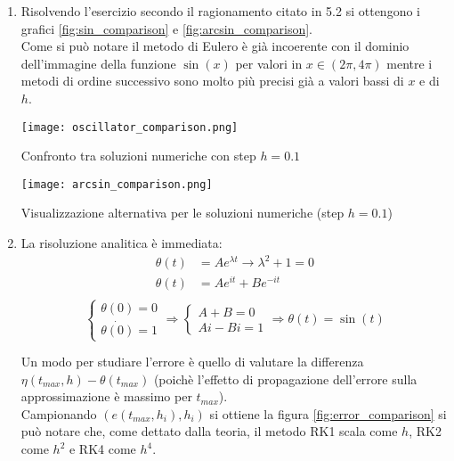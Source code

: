 \begin{enumerate}
	\item Risolvendo l'esercizio secondo il ragionamento citato in 5.2 %
	      si ottengono i grafici \ref{fig:sin_comparison} e
	      \ref{fig:arcsin_comparison}. \\
	      Come si può notare il metodo di Eulero è
	      già incoerente con il dominio dell'immagine della funzione $\sin(x)$
	      per valori in $x \in (2\pi, 4\pi)$ mentre i metodi di ordine successivo  sono molto più precisi già a valori bassi di $x$ e di $h$.

	      \begin{marginfigure}
		      \hspace*{-2cm}
		      \texttt{[image: oscillator\_comparison.png]}
		      \caption{Confronto tra soluzioni numeriche con step $h=0.1$}
		      \label{fig:sin_comparison}
	      \end{marginfigure}

	      \begin{marginfigure}
		      \hspace*{-2cm}
		      \texttt{[image: arcsin\_comparison.png]}
		      \caption{Visualizzazione alternativa per le soluzioni numeriche
			      (step $h=0.1$)}
		      \label{fig:arcsin_comparison}
		      \labfig{expfunc}
	      \end{marginfigure}

	\item La risoluzione analitica è immediata:
	      \begin{align*}
		      \theta(t) & = Ae^{\lambda t} \rightarrow \lambda^2 + 1 = 0 \\
		      \theta(t) & = Ae^{it} + Be^{-it}                           \\
	      \end{align*}
	      \[
		      \begin{cases}
			      \theta(0) = 0 \\
			      \dot{\theta(0)} = 1
		      \end{cases}
		      \Rightarrow
		      \begin{cases}
			      A+B=0 \\
			      Ai-Bi = 1
		      \end{cases}
		      \Rightarrow
		      \theta(t) = \sin(t)
	      \]

	      Un modo per studiare l'errore è quello di valutare la
	      differenza $\eta(t_{max}, h) - \theta(t_{max})$ (poichè l'effetto di
	      propagazione dell'errore sulla approssimazione è massimo per $t_{max}$). \\
	      Campionando $(e(t_{max}, h_i), h_i)$ si ottiene la figura
	      \ref{fig:error_comparison} si può notare che, come dettato dalla
	      teoria, il metodo RK1 scala come $h$, RK2 come ${h}^2$ e RK4 come $h^{4}$.


\end{enumerate}
